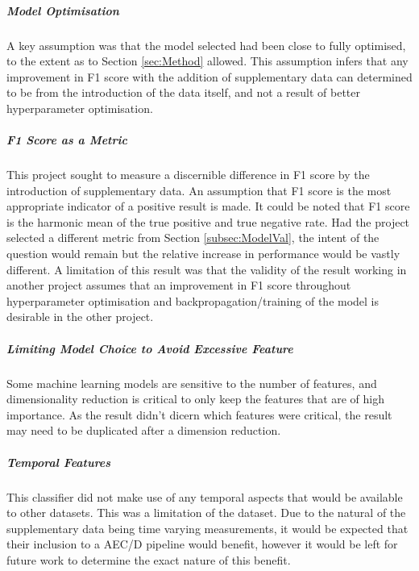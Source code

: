 \documentclass{UoNMCHA}
\newcommand{\sref}[1] {Section \ref{#1}}
\numberwithin{equation}{section}
\begin{document}
\subparagraph{Model Optimisation}
A key assumption was that the model selected had been close to fully optimised, to the extent as to \sref{sec:Method} allowed. This assumption infers that any improvement in F1 score with the addition of supplementary data can determined to be from the introduction of the data itself, and not a result of better hyperparameter optimisation.

\subparagraph{F1 Score as a Metric}
This project sought to measure a discernible difference in F1 score by the introduction of supplementary data. An assumption that F1 score is the most appropriate indicator of a positive result is made. It could be noted that F1 score is the harmonic mean of the true positive and true negative rate. Had the project selected a different metric from \sref{subsec:ModelVal}, the intent of the question would remain but the relative increase in performance would be vastly different. A limitation of this result was that the validity of the result working in another project assumes that an improvement in F1 score throughout hyperparameter optimisation and backpropagation/training of the model is desirable in the other project.

\subparagraph{Limiting Model Choice to Avoid Excessive Feature}
Some machine learning models are sensitive to the number of features, and dimensionality reduction is critical to only keep the features that are of high importance. As the result didn't dicern which features were critical, the result may need to be duplicated after a dimension reduction.

\subparagraph{Temporal Features}
This classifier did not make use of any temporal aspects that would be available to other datasets. This was a limitation of the dataset. Due to the natural of the supplementary data being time varying measurements, it would be expected that their inclusion to a AEC/D pipeline would benefit, however it would be left for future work to determine the exact nature of this benefit.
\end{document}
